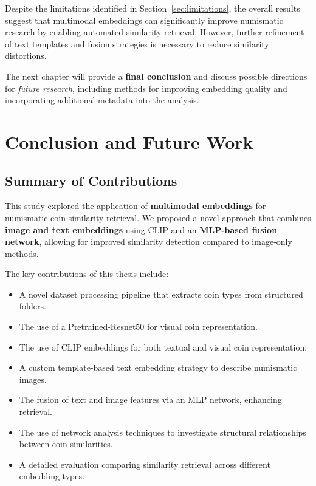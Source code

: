 \documentclass[nolibertine, english, algorithm, nomencl, minted]{ttlab-qualify}
\begin{document}
Despite the limitations identified in Section~\ref{sec:limitations}, the overall results suggest 
that multimodal embeddings can significantly improve numismatic research by enabling automated similarity retrieval. 
However, further refinement of text templates and fusion strategies is necessary to reduce similarity distortions.

The next chapter will provide a \textbf{final conclusion} and discuss possible directions 
for \textit{future research}, including methods for improving embedding quality and incorporating 
additional metadata into the analysis.


\chapter{Conclusion and Future Work}
\label{chap:conclusion}

\section{Summary of Contributions}
\label{sec:summary_contributions}

This study explored the application of \textbf{multimodal embeddings} for numismatic coin similarity retrieval. 
We proposed a novel approach that combines \textbf{image and text embeddings} using CLIP and an \textbf{MLP-based fusion network}, 
allowing for improved similarity detection compared to image-only methods.

The key contributions of this thesis include:
\begin{itemize}
    \item A novel dataset processing pipeline that extracts coin types from structured folders.
    \item The use of a Pretrained-Resnet50 for visual coin representation.
    \item The use of CLIP embeddings for both textual and visual coin representation.
    \item A custom template-based text embedding strategy to describe numismatic images.
    \item The fusion of text and image features via an MLP network, enhancing retrieval.
    \item The use of network analysis techniques to investigate structural relationships between coin similarities.
    \item A detailed evaluation comparing similarity retrieval across different embedding types.
\end{itemize}
\end{document}
